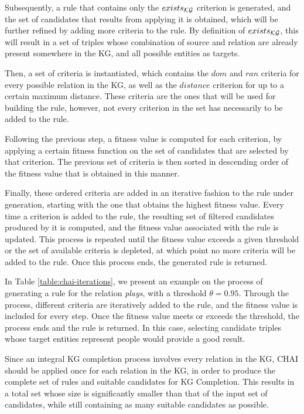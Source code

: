 Subsequently, a rule that contains only the $exists_{\textmd{\textup{\ensuremath{\mathcal{K}}\ensuremath{\mathcal{G}}}}}$ criterion is generated, and the set of candidates that results from applying it is obtained, which will be further refined by adding more criteria to the rule. By definition of $exists_{\textmd{\textup{\ensuremath{\mathcal{K}}\ensuremath{\mathcal{G}}}}}$, this will result in a set of triples whose combination of source and relation are already present somewhere in the KG, and all possible entities as targets.

Then, a set of criteria is instantiated, which contains the $dom$ and $ran$ criteria for every possible relation in the KG, as well as the $distance$ criterion for up to a certain maximum distance. These criteria are the ones that will be used for building the rule, however, not every criterion in the set has necessarily to be added to the rule.

Following the previous step, a fitness value is computed for each criterion, by applying a certain fitness function on the set of candidates that are selected by that criterion. The previous set of criteria is then sorted in descending order of the fitness value that is obtained in this manner.

Finally, these ordered criteria are added in an iterative fashion to the rule under generation, starting with the one that obtains the highest fitness value. Every time a criterion is added to the rule, the resulting set of filtered candidates produced by it is computed, and the fitness value associated with the rule is updated. This process is repeated until the fitness value exceeds a given threshold or the set of available criteria is depleted, at which point no more criteria will be added to the rule. Once this process ends, the generated rule is returned.

In Table \ref{table:chai-iterations}, we present an example on the process of generating a rule for the relation \textit{plays}, with a threshold $\theta = 0.95$. Through the process, different criteria are iteratively added to the rule, and the fitness value is included for every step. Once the fitness value meets or exceeds the threshold, the process ends and the rule is returned. In this case, selecting candidate triples whose target entities represent people would provide a good result.



Since an integral KG completion process involves every relation in the KG, CHAI should be applied once for each relation in the KG, in order to produce the complete set of rules and suitable candidates for KG Completion. This results in a total set whose size is significantly smaller than that of the input set of candidates, while still containing as many suitable candidates as possible.

